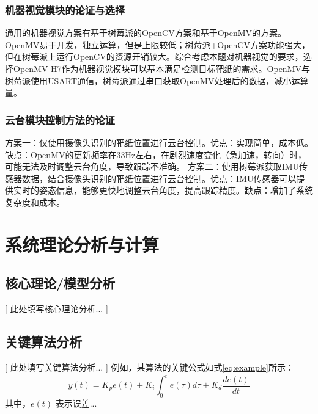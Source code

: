 \documentclass[UTF-8,zihao=-4]{ctexart}
\begin{document}
\subsubsection{机器视觉模块的论证与选择}
    通用的机器视觉方案有基于树莓派的OpenCV方案和基于OpenMV的方案。OpenMV易于开发，独立运算，但是上限较低；树莓派+OpenCV方案功能强大，但在树莓派上运行OpenCV的资源开销较大。综合考虑本题对机器视觉的要求，选择OpenMV H7作为机器视觉模块可以基本满足检测目标靶纸的需求。OpenMV与树莓派使用USART通信，树莓派通过串口获取OpenMV处理后的数据，减小运算量。
\subsubsection{云台模块控制方法的论证}
    方案一：仅使用摄像头识别的靶纸位置进行云台控制。优点：实现简单，成本低。缺点：OpenMV的更新频率在33Hz左右，在剧烈速度变化（急加速，转向）时，可能无法及时调整云台角度，导致跟踪不准确。
    方案二：使用树莓派获取IMU传感器数据，结合摄像头识别的靶纸位置进行云台控制。优点：IMU传感器可以提供实时的姿态信息，能够更快地调整云台角度，提高跟踪精度。缺点：增加了系统复杂度和成本。

\section{系统理论分析与计算}
\subsection{核心理论/模型分析}
    [ 此处填写核心理论分析... ]
    
    
\subsection{关键算法分析}
    [ 此处填写关键算法分析... ]
    例如，某算法的关键公式如式\ref{eq:example}所示：
    \begin{equation} \label{eq:example}
        y(t) = K_p e(t) + K_i \int_0^t e(\tau)d\tau + K_d \frac{de(t)}{dt}
    \end{equation}
    其中，$e(t)$ 表示误差... %
\end{document}
